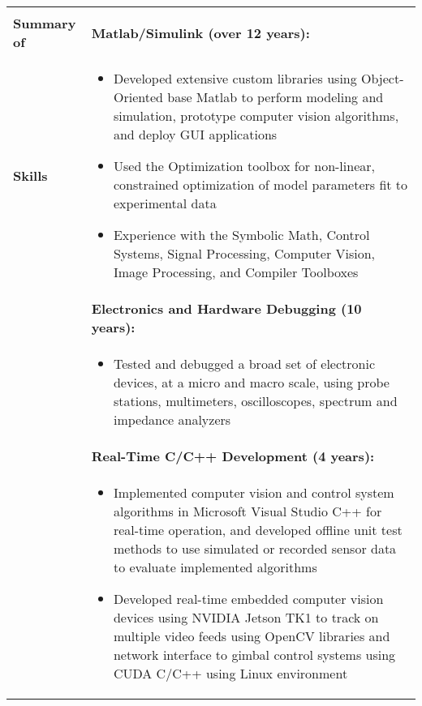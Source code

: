 \begin{tabular}{L{\hlcolw}  L{\rcolw}}
	\hline \hline \\
	\textbf{\Large Summary of } & 
	\textbf{Matlab/Simulink (over 12 years):} 
	\\
	\textbf{\Large Skills} & 
	\vspace{-0.25in}
	
	\begin{itemize}[leftmargin = \itemmargin]
		
		\item Developed extensive custom libraries using Object-Oriented base Matlab to perform modeling and simulation, 
		prototype computer vision algorithms, and deploy GUI applications
		
		\item Used the Optimization toolbox for non-linear, constrained optimization of model parameters fit to experimental data
		
		\item Experience with the Symbolic Math, Control Systems, Signal Processing, Computer Vision, Image Processing, and Compiler Toolboxes
		
	\end{itemize} \\
	
	& \textbf{Electronics and Hardware Debugging (10 years):} \\
	&
	\vspace{-0.25in}
	\begin{itemize}[leftmargin = \itemmargin]
		\item Tested and debugged a broad set of electronic devices, at a micro and macro scale, using probe stations, multimeters, oscilloscopes, spectrum and impedance analyzers
	\end{itemize}
	\\
	
	& \textbf{Real-Time C/C++ Development (4 years):}\\
	&
	\vspace{-0.25in}
	\begin{itemize}[leftmargin = \itemmargin]
		\item Implemented computer vision and control system algorithms in Microsoft Visual Studio C++ for real-time operation, and developed offline unit test methods to use simulated or recorded sensor data to evaluate implemented algorithms
	
		\item Developed real-time embedded computer vision devices using NVIDIA Jetson TK1 to track on multiple video feeds using OpenCV libraries and network interface to gimbal control systems using CUDA C/C++ using Linux environment
	

\end{itemize}
\end{tabular}
